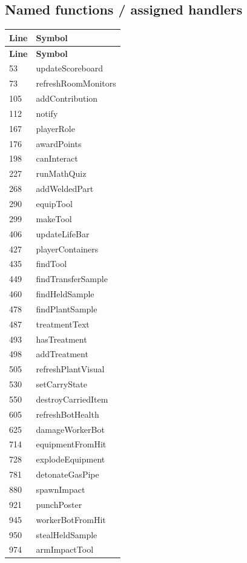 \subsection{Named functions /\allowbreak{} assigned handlers}
\begin{longtable}{p{}p{}}
\toprule
\textbf{Line} & \textbf{Symbol} \\ \midrule
\endfirsthead
\textbf{Line} & \textbf{Symbol} \\ \midrule
\endhead
53 & updateScoreboard \\
73 & refreshRoomMonitors \\
105 & addContribution \\
112 & notify \\
167 & playerRole \\
176 & awardPoints \\
198 & canInteract \\
227 & runMathQuiz \\
268 & addWeldedPart \\
290 & equipTool \\
299 & makeTool \\
406 & updateLifeBar \\
427 & playerContainers \\
435 & findTool \\
449 & findTransferSample \\
460 & findHeldSample \\
478 & findPlantSample \\
487 & treatmentText \\
493 & hasTreatment \\
498 & addTreatment \\
505 & refreshPlantVisual \\
530 & setCarryState \\
550 & destroyCarriedItem \\
605 & refreshBotHealth \\
625 & damageWorkerBot \\
714 & equipmentFromHit \\
728 & explodeEquipment \\
781 & detonateGasPipe \\
880 & spawnImpact \\
921 & punchPoster \\
945 & workerBotFromHit \\
950 & stealHeldSample \\
974 & armImpactTool \\

\end{longtable}
